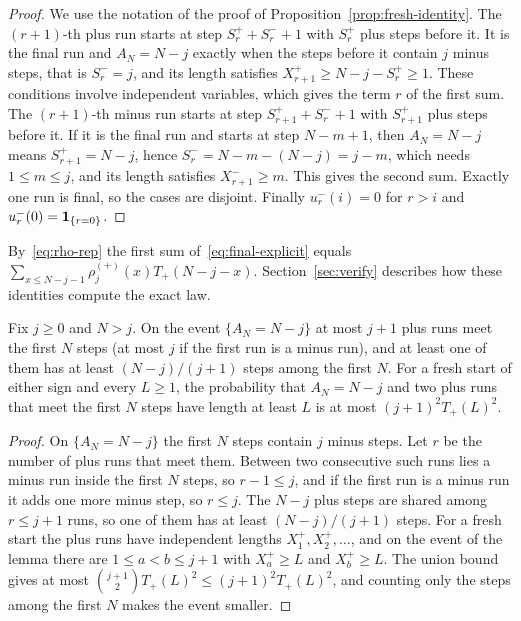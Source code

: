 \begin{proof}
We use the notation of the proof of Proposition~\ref{prop:fresh-identity}. The
$(r+1)$-th plus run starts at step $S^\plus_r+S^\minus_r+1$ with $S^\plus_r$ plus steps
before it. It is the final run and $A_N=N-j$ exactly when the steps before it contain
$j$ minus steps, that is $S^\minus_r=j$, and its length satisfies
$X^\plus_{r+1}\ge N-j-S^\plus_r\ge1$. These conditions involve independent variables,
which gives the term $r$ of the first sum. The $(r+1)$-th minus run starts at step
$S^\plus_{r+1}+S^\minus_r+1$ with $S^\plus_{r+1}$ plus steps before it. If it is the
final run and starts at step $N-m+1$, then $A_N=N-j$ means $S^\plus_{r+1}=N-j$, hence
$S^\minus_r=N-m-(N-j)=j-m$, which needs $1\le m\le j$, and its length satisfies
$X^\minus_{r+1}\ge m$. This gives the second sum. Exactly one run is final, so the
cases are disjoint. Finally $u^\minus_r(i)=0$ for $r>i$ and $u^{-}_r(0)=\mathbf{1}_{\{r=0\}}$.
\end{proof}

By~\eqref{eq:rho-rep} the first sum of~\eqref{eq:final-explicit} equals
$\sum_{x\le N-j-1}\rho^{(\plus)}_j(x)T_\plus(N-j-x)$. Section~\ref{sec:verify} describes
how these identities compute the exact law.

\begin{lemma}\label{lem:counting}
Fix $j\ge0$ and $N>j$. On the event $\{A_N=N-j\}$ at most $j+1$ plus runs meet the
first $N$ steps (at most $j$ if the first run is a minus run), and at least one of
them has at least $(N-j)/(j+1)$ steps among the first $N$. For a fresh start of
either sign and every $L\ge1$, the probability that $A_N=N-j$ and two plus runs
that meet the first $N$ steps have length at least $L$ is at most
$(j+1)^2T_\plus(L)^2$.
\end{lemma}

\begin{proof}
On $\{A_N=N-j\}$ the first $N$ steps contain $j$ minus steps. Let $r$ be the number of
plus runs that meet them. Between two consecutive such runs lies a minus run inside
the first $N$ steps, so $r-1\le j$, and if the first run is a minus run it adds one
more minus step, so $r\le j$. The $N-j$ plus steps are shared among $r\le j+1$ runs,
so one of them has at least $(N-j)/(j+1)$ steps. For a fresh start the plus runs have
independent lengths $X^\plus_1,X^\plus_2,\dots$, and on the event of the lemma there
are $1\le a<b\le j+1$ with $X^\plus_a\ge L$ and $X^\plus_b\ge L$. The union bound gives
at most $\binom{j+1}2T_\plus(L)^2\le(j+1)^2T_\plus(L)^2$, and counting only the steps
among the first $N$ makes the event smaller.
\end{proof}
